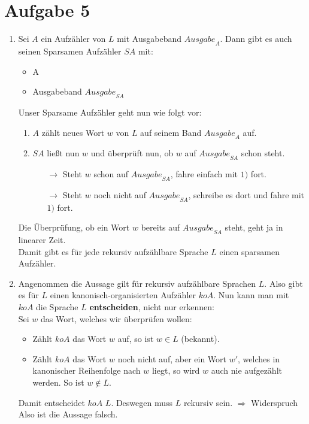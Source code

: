 \documentclass[a4paper,11pt]{scrartcl}
\begin{document}
	
	\section*{Aufgabe 5}
	\begin{enumerate}[label=(\alph*)]
	\item	Sei $A$ ein Aufzähler von $L$ mit Ausgabeband ${Ausgabe}_A$. Dann gibt es auch seinen Sparsamen Aufzähler $SA$ mit:
			\begin{itemize}
			\item A
			\item Ausgabeband ${Ausgabe}_{SA}$
			\end{itemize}
			Unser Sparsame Aufzähler geht nun wie folgt vor:
			\begin{enumerate}[label=\arabic*)]
			\item $A$ zählt neues Wort $w$ von $L$ auf seinem Band ${Ausgabe}_A$ auf.
			\item $SA$ ließt nun $w$ und überprüft nun, ob $w$ auf ${Ausgabe}_{SA}$ schon steht.
				\begin{itemize}
				\item[$\rightarrow$] Steht $w$ schon auf ${Ausgabe}_{SA}$, fahre einfach mit $1)$ fort.
				\item[$\rightarrow$] Steht $w$ noch nicht auf ${Ausgabe}_{SA}$, schreibe es dort und fahre mit $1)$ fort.
				\end{itemize}
			\end{enumerate}
			Die Überprüfung, ob ein Wort $w$ bereits auf ${Ausgabe}_{SA}$ steht, geht ja in linearer Zeit.\\
			Damit gibt es für jede rekursiv aufzählbare Sprache $L$ einen sparsamen Aufzähler.
	
	\item	Angenommen die Aussage gilt für rekursiv aufzählbare Sprachen $L$. Also gibt es für $L$ einen kanonisch-organisierten Aufzähler $koA$. Nun kann man mit $koA$ die Sprache $L$ \textbf{entscheiden}, nicht nur erkennen:\\
			Sei $w$ das Wort, welches wir überprüfen wollen:
			\begin{itemize}
			\item Zählt $koA$ das Wort $w$ auf, so ist $w \in L$ (bekannt).
			\item Zählt $koA$ das Wort $w$ noch nicht auf, aber ein Wort $w'$, welches in kanonischer Reihenfolge nach $w$ liegt, so wird $w$ auch nie aufgezählt werden. So ist $w \not\in L$.
			\end{itemize}
			Damit entscheidet $koA$ $L$. Deswegen muss $L$ rekursiv sein. $\Rightarrow$ Widerspruch \\
			Also ist die Aussage falsch.
	\end{enumerate}
	
\end{document}
